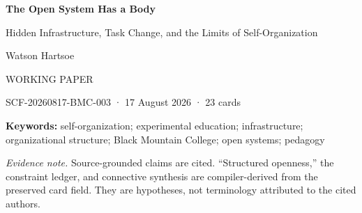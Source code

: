 \documentclass[11pt]{article}
\begin{document}

\begin{titlepage}
\thispagestyle{empty}
\vspace*{0.7in}
{\huge\bfseries The Open System Has a Body\par}
\vspace{0.12in}
{\Large Hidden Infrastructure, Task Change, and the Limits of Self-Organization\par}
\vspace{0.5in}
{\large Watson Hartsoe\par}
\vspace{0.2in}
{\small WORKING PAPER\par}
\vfill
{\small SCF-20260817-BMC-003 · 17 August 2026 · 23 cards\par}
\end{titlepage}

\begin{abstract}
Experimental organizations often describe openness by subtraction: fewer grades, fewer leaders, fewer prescribed agendas, fewer constraints. Across Black Mountain College, Black Mountain SOLE, Sugata Mitra's SOLE design, Harrison Owen's Open Space Technology, Jo Freeman's account of structurelessness, and the Granny Cloud's own history, a different mechanism appears. Self-organization repeatedly depends on conditions that vanish from view when they work: device ratios, facilitator timing, volunteer attention, physical access, connectivity, boundary translation, and task-specific coordination. Two failures are especially diagnostic. First, Black Mountain SOLE's showcase success bypassed the MOOCs that nominally defined the experiment. Second, the Granny Cloud's online relation became unavailable when children could not reach physical centres and volunteers themselves aged. These cases suggest that the relevant unit is neither structure nor freedom but the placement, task-fit, infrastructural support, and revisability of constraints. I develop ``structured openness'' as a provisional hypothesis and propose a constraint ledger for testing it rather than treating it as a celebratory label.
\end{abstract}

\textbf{Keywords:} self-organization; experimental education; infrastructure; organizational structure; Black Mountain College; open systems; pedagogy

\textit{Evidence note.} Source-grounded claims are cited. ``Structured openness,'' the constraint ledger, and connective synthesis are compiler-derived from the preserved card field. They are hypotheses, not terminology attributed to the cited authors.
\end{document}
